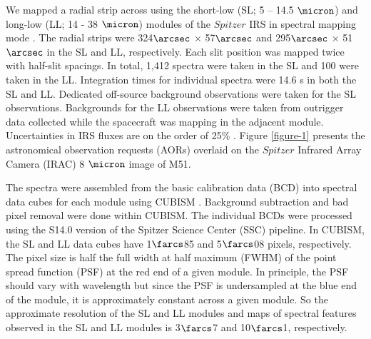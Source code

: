 \documentclass[12pt,preprint]{aastex}
\begin{document}
We mapped a radial strip across  using the short-low
(SL; 5 -- 14.5 $\micron$) and long-low (LL; 14 - 38 $\micron$) 
modules of the $Spitzer$ IRS in spectral
mapping mode \citep{hou04}.  The radial strips were 324$\arcsec$ $\times$
57$\arcsec$ and 295$\arcsec$ $\times$ 51$\arcsec$ in the SL and LL,
respectively.  Each slit position was mapped twice with half-slit spacings.  In
total, 1,412 spectra were taken in the SL and 100 were taken in the LL.  
Integration times for individual 
spectra were 14.6 s in both the SL and LL.  Dedicated off-source 
background observations were taken for the SL observations.  Backgrounds for the
LL observations were taken from outrigger data collected while the
spacecraft was mapping in the adjacent module.  Uncertainties in 
IRS fluxes are on the order of 25\% \citep{smi04}.  Figure \ref{figure-1} 
presents the astronomical observation requests (AORs)
overlaid on the $Spitzer$ Infrared Array Camera (IRAC) 8 $\micron$ image of M51.

The spectra were assembled from the basic calibration data (BCD) into
spectral data cubes for each module using CUBISM \citep{ken03, smi04, smi07b}.
Background subtraction and bad pixel removal were done within CUBISM.
The individual BCDs were processed using the S14.0 version of
the Spitzer Science Center (SSC) pipeline.  In CUBISM, the SL and LL
data cubes have 1$\farcs$85 and 5$\farcs$08 pixels,
respectively.  The pixel size is half the full width at half 
maximum (FWHM) of the point spread function (PSF)
at the red end of a given module.  In principle, the PSF should 
vary with wavelength but since the PSF is
undersampled at the blue end of the module, it is approximately
constant across a given module.  So the approximate resolution of the
SL and LL modules and maps of spectral features observed 
in the SL and LL modules is 3$\farcs$7 and 10$\farcs$1, respectively.
\end{document}
